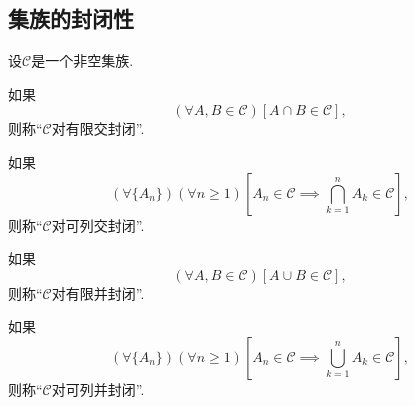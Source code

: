 \subsection{集族的封闭性}
\begin{definition}[集族的封闭性]
设\(\mathcal{C}\)是一个非空集族.

如果\begin{equation*}
	(\forall A,B\in\mathcal{C})
	[A \cap B \in \mathcal{C}],
\end{equation*}
则称“\(\mathcal{C}\)对有限交封闭”.

如果\begin{equation*}
	(\forall \{A_n\})
	(\forall n\geq1)
	\left[A_n\in\mathcal{C} \implies \bigcap_{k=1}^n A_k \in \mathcal{C}\right],
\end{equation*}
则称“\(\mathcal{C}\)对可列交封闭”.

如果\begin{equation*}
	(\forall A,B\in\mathcal{C})
	[A \cup B \in \mathcal{C}],
\end{equation*}
则称“\(\mathcal{C}\)对有限并封闭”.

如果\begin{equation*}
	(\forall \{A_n\})
	(\forall n\geq1)
	\left[A_n\in\mathcal{C} \implies \bigcup_{k=1}^n A_k \in \mathcal{C}\right],
\end{equation*}
则称“\(\mathcal{C}\)对可列并封闭”.
\end{definition}


